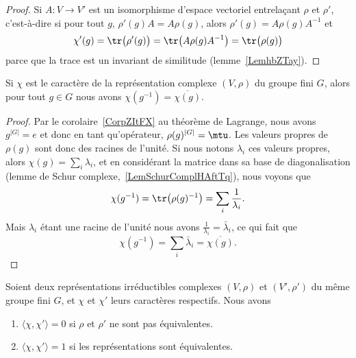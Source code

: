 \begin{proof}
	Si \( A\colon V\to V'\) est un isomorphisme d'espace vectoriel entrelaçant \( \rho\) et \( \rho'\), c'est-à-dire si pour tout \( g\), \( \rho'(g)A=A\rho(g)\), alors \( \rho'(g)=A\rho(g)A^{-1}\) et
	\begin{equation}
		\chi'(g)=\tr\big( \rho'(g) \big)=\tr\big( A\rho(g)A^{-1} \big)=\tr\big( \rho(g) \big)
	\end{equation}
	parce que la trace est un invariant de similitude (lemme~\ref{LemhbZTay}).
\end{proof}

\begin{lemma}   \label{LemJqIZns}
	Si \( \chi\) est le caractère de la représentation complexe \( (V,\rho)\) du groupe fini \( G\), alors pour tout \( g\in G\) nous avons \( \chi(g^{-1})=\overline{ \chi(g) }\).
\end{lemma}

\begin{proof}
	Par le corolaire~\ref{CorpZItFX} au théorème de Lagrange, nous avons \( g^{| G |}=e\) et donc en tant qu'opérateur, \( \rho(g)^{| G |}=\mtu\). Les valeurs propres de \( \rho(g)\) sont donc des racines de l'unité. Si nous notons \( \lambda_i\) ces valeurs propres, alors \( \chi(g)=\sum_i\lambda_i\), et en considérant la matrice dans sa base de diagonalisation (lemme de Schur complexe,~\ref{LemSchurComplHAftTq}), nous voyons que
	\begin{equation}
		\chi(g^{-1})=\tr\big( \rho(g)^{-1} \big)=\sum_i\frac{1}{ \lambda_i }.
	\end{equation}
	Mais \( \lambda_i\) étant une racine de l'unité nous avons \( \frac{1}{ \lambda_i }=\bar\lambda_i\), ce qui fait que
	\begin{equation}
		\chi(g^{-1})=\sum_i\bar\lambda_i=\overline{ \chi(g) }.
	\end{equation}
\end{proof}

\begin{proposition} \label{PropJzbfWi}
	Soient deux représentations irréductibles complexes \( (V,\rho)\) et \( (V',\rho')\) du même groupe fini \( G\), et \( \chi\) et \( \chi'\) leurs caractères respectifs. Nous avons
	\begin{enumerate}
		\item
		      \( \langle \chi, \chi'\rangle =0\) si \( \rho\) et \( \rho'\) ne sont pas équivalentes.
		\item
		      \( \langle \chi, \chi'\rangle =1\) si les représentations sont équivalentes.
	\end{enumerate}
\end{proposition}

